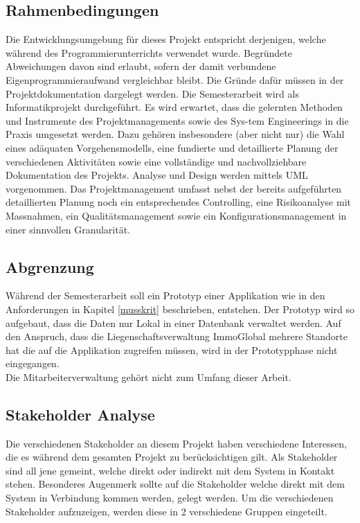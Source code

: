\subsection{Rahmenbedingungen}

Die Entwicklungsumgebung für dieses Projekt entspricht derjenigen, welche während des Programmierunterrichts verwendet wurde. Begründete Abweichungen davon sind erlaubt, sofern der damit verbundene Eigenprogrammieraufwand vergleichbar bleibt. Die Gründe dafür müssen in der Projektdokumentation dargelegt werden.
Die Semesterarbeit wird als Informatikprojekt durchgeführt. Es wird erwartet, dass die gelernten Methoden und Instrumente des Projektmanagements sowie des Sys-tem Engineerings in die Praxis umgesetzt werden. Dazu gehören insbesondere (aber nicht nur) die Wahl eines adäquaten Vorgehensmodells, eine fundierte und detaillierte Planung der verschiedenen Aktivitäten sowie eine vollständige und nachvollziehbare Dokumentation des Projekts. Analyse und Design werden mittels UML vorgenommen.
Das Projektmanagement umfasst nebst der bereits aufgeführten detaillierten Planung noch ein entsprechendes Controlling, eine Risikoanalyse mit Massnahmen, ein Qualitätsmanagement sowie ein Konfigurationsmanagement in einer sinnvollen Granularität.

\subsection{Abgrenzung}
Während der Semesterarbeit soll ein Prototyp einer Applikation wie in den Anforderungen in Kapitel \ref{musskrit} beschrieben, entstehen. Der Prototyp wird so aufgebaut, dass die Daten nur Lokal in einer Datenbank verwaltet werden. Auf den Anspruch, dass die Liegenschaftsverwaltung ImmoGlobal mehrere Standorte hat die auf die Applikation zugreifen müssen, wird in der Prototypphase nicht eingegangen.\\
Die Mitarbeiterverwaltung gehört nicht zum Umfang dieser Arbeit.

\subsection{Stakeholder Analyse}
Die verschiedenen Stakeholder an diesem Projekt haben verschiedene Interessen, die es während dem gesamten Projekt zu berücksichtigen gilt. Als Stakeholder sind all jene gemeint, welche direkt oder indirekt mit dem System in Kontakt stehen. Besonderes Augenmerk sollte auf die Stakeholder welche direkt mit dem System in Verbindung kommen werden, gelegt werden.
Um die verschiedenen Stakeholder aufzuzeigen, werden diese in 2 verschiedene Gruppen eingeteilt.

